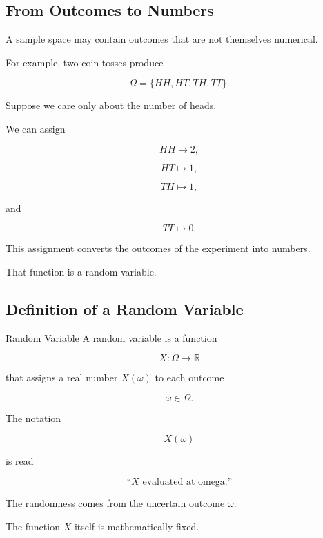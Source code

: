 \subsection{From Outcomes to Numbers}
\label{subsec:from-outcomes-to-numbers}

A sample space may contain outcomes that are not themselves numerical.

For example, two coin tosses produce

\[
\Omega
=
\{HH,HT,TH,TT\}.
\]

Suppose we care only about the number of heads.

We can assign

\[
HH\longmapsto2,
\]

\[
HT\longmapsto1,
\]

\[
TH\longmapsto1,
\]

and

\[
TT\longmapsto0.
\]

This assignment converts the outcomes of the experiment into numbers.

That function is a random variable.

\subsection{Definition of a Random Variable}
\label{subsec:random-variable-definition}

\begin{definitionbox}{Random Variable}
A random variable is a function

\[
\boxed{
X:\Omega\to\mathbb{R}
}
\]

that assigns a real number \(X(\omega)\) to each outcome

\[
\omega\in\Omega.
\]
\end{definitionbox}

The notation

\[
X(\omega)
\]

is read

\[
\text{``\(X\) evaluated at omega.''}
\]

The randomness comes from the uncertain outcome \(\omega\).

The function \(X\) itself is mathematically fixed.

